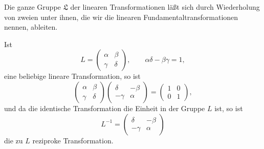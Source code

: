 \documentclass[11pt]{article}
\begin{document}
Die ganze Gruppe $\mathfrak L$ der linearen Transformationen läßt sich durch Wiederholung von zweien unter ihnen, die wir die linearen Fundamentaltransformationen nennen, ableiten.

Ist
\[
L=\begin{pmatrix}\alpha&\beta\\\gamma&\delta\end{pmatrix},
\qquad \alpha\delta-\beta\gamma=1,
\]
eine beliebige lineare Transformation, so ist
\begin{equation}
\begin{pmatrix}\alpha&\beta\\\gamma&\delta\end{pmatrix}
\begin{pmatrix}\delta&-\beta\\-\gamma&\alpha\end{pmatrix}
=\begin{pmatrix}1&0\\0&1\end{pmatrix}, \tag{1}
\end{equation}
und da die identische Transformation die Einheit in der Gruppe $L$ ist, so ist
\[
L^{-1}=\begin{pmatrix}\delta&-\beta\\-\gamma&\alpha\end{pmatrix}
\]
die zu $L$ reziproke Transformation.
\end{document}

